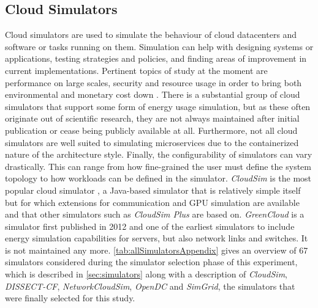 \subsection{Cloud Simulators}
Cloud simulators are used to simulate the behaviour of cloud datacenters and software or tasks running on them. Simulation can help with designing systems or applications, testing strategies and policies, and finding areas of improvement in current implementations. Pertinent topics of study at the moment are performance on large scales, security and resource usage in order to bring both environmental and monetary cost down \cite{mansouri_cloud_2020}. There is a substantial group of cloud simulators that support some form of energy usage simulation, but as these often originate out of scientific research, they are not always maintained after initial publication or cease being publicly available at all. Furthermore, not all cloud simulators are well suited to simulating microservices due to the containerized nature of the architecture style. Finally, the configurability of simulators can vary drastically. This can range from how fine-grained the user must define the system topology to how workloads can be defined in the simulator. \textit{CloudSim} \cite{buyya_energy_2024} is the most popular cloud simulator \cite{ahmed_cloud_2014}, a Java-based simulator that is relatively simple itself but for which extensions for \eg communication and GPU simulation are available and that other simulators such as \textit{CloudSim Plus} \cite{silva_filho_cloudsim_2017} are based on. \textit{GreenCloud} \cite{kliazovich_greencloud_2010} is a simulator first published in 2012 and one of the earliest simulators to include energy simulation capabilities for servers, but also network links and switches. It is not maintained any more. \autoref{tab:allSimulatorsAppendix} gives an overview of 67 simulators considered during the simulator selection phase of this experiment, which is described in \autoref{sec:simulators} along with a description of \textit{CloudSim}, \textit{DISSECT-CF}, \textit{NetworkCloudSim}, \textit{OpenDC} and \textit{SimGrid}, the simulators that were finally selected for this study.



